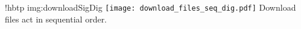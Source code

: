 \namedfigure
{!hbtp}
{img:downloadSigDig}
{\texttt{[image: download\_files\_seq\_dig.pdf]}}
{Download files act in sequential order.}
